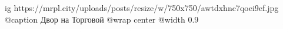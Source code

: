  
 
 
 
 

\ifcmt
  ig https://mrpl.city/uploads/posts/resize/w/750x750/awtdxhnc7qoei9ef.jpg
	@caption Двор на Торговой
  @wrap center
  @width 0.9
\fi
